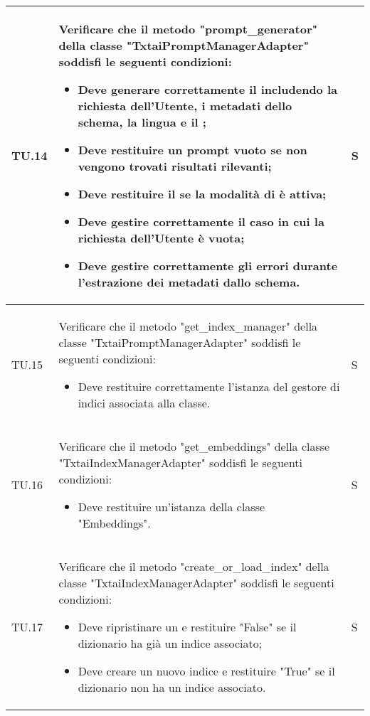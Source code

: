 \begin{adjustwidth}{-0.5cm}{-0.5cm}
\begin{longtable}{|P{1.5cm}|>{\raggedright}P{9.5cm}|>{\arraybackslash}P{1.5cm}|}
		\hline TU.14 & Verificare che il metodo "prompt\_generator" della classe "TxtaiPromptManagerAdapter" soddisfi le seguenti condizioni:
		\begin{itemize}
			\item Deve generare correttamente il  includendo la richiesta dell'Utente, i metadati dello schema, la lingua e il ;
			\item Deve restituire un prompt vuoto se non vengono trovati risultati rilevanti;
			\item Deve restituire il  se la modalità di  è attiva;
			\item Deve gestire correttamente il caso in cui la richiesta dell'Utente è vuota;
			\item Deve gestire correttamente gli errori durante l'estrazione dei metadati dallo schema.
		\end{itemize} & S \\

		\hline TU.15 & Verificare che il metodo "get\_index\_manager" della classe "TxtaiPromptManagerAdapter" soddisfi le seguenti condizioni:
		\begin{itemize}
			\item Deve restituire correttamente l'istanza del gestore di indici associata alla classe.
		\end{itemize} & S \\

		\hline TU.16 & Verificare che il metodo "get\_embeddings" della classe "TxtaiIndexManagerAdapter" soddisfi le seguenti condizioni:
		\begin{itemize}
			\item Deve restituire un'istanza della classe "Embeddings".
		\end{itemize} & S \\

		\hline TU.17 & Verificare che il metodo "create\_or\_load\_index" della classe "TxtaiIndexManagerAdapter" soddisfi le seguenti condizioni:
		\begin{itemize}
			\item Deve ripristinare un  e restituire "False" se il dizionario ha già un indice associato;
			\item Deve creare un nuovo indice e restituire "True" se il dizionario non ha un indice associato.
		\end{itemize} & S \\


\end{longtable}
\end{adjustwidth}
